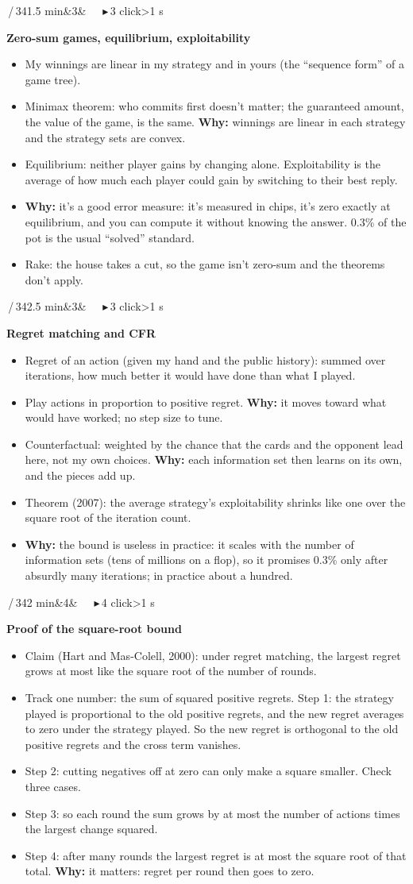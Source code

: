 \documentclass{article}
\newcommand{\slide}[4]{\clearpage
  \noindent\colorbox{bar}{\parbox{\dimexpr\linewidth-2\fboxsep}{\color{white}\fontsize{13}{15}\selectfont
  \textbf{\fontsize{21}{23}\selectfont #1}\,/\,34\hfill #3\ifx&#4&\else\ \ \ \textcolor{ck!40!white}{\ensuremath{\blacktriangleright}}\,#4 click\ifnum#4>1 s\fi\fi\\[2pt]
  \raggedright\textbf{\fontsize{15}{17.5}\selectfont #2}}}\par\vspace{5pt}
  \fontsize{15}{17.8}\selectfont\raggedright}
\newcommand{\pt}{\item[\textbullet]}
\newcommand{\ck}{\item[\textcolor{ck}{\ensuremath{\blacktriangleright}}]}
\newcommand{\why}{\textcolor{why}{\textbf{Why:}} }
\begin{document}
\slide{4}{Zero-sum games, equilibrium, exploitability}{1.5 min}{3}
\begin{itemize}
\pt My winnings are linear in my strategy and in yours (the ``sequence form'' of a game tree).
\ck Minimax theorem: who commits first doesn't matter; the guaranteed amount, the value of the game, is the same. \why winnings are linear in each strategy and the strategy sets are convex.
\ck Equilibrium: neither player gains by changing alone. Exploitability is the average of how much each player could gain by switching to their best reply.
\pt \why it's a good error measure: it's measured in chips, it's zero exactly at equilibrium, and you can compute it without knowing the answer. 0.3\% of the pot is the usual ``solved'' standard.
\ck Rake: the house takes a cut, so the game isn't zero-sum and the theorems don't apply.
\end{itemize}

\slide{5}{Regret matching and CFR}{2.5 min}{3}
\begin{itemize}
\pt Regret of an action (given my hand and the public history): summed over iterations, how much better it would have done than what I played.
\pt Play actions in proportion to positive regret. \why it moves toward what would have worked; no step size to tune.
\ck Counterfactual: weighted by the chance that the cards and the opponent lead here, not my own choices. \why each information set then learns on its own, and the pieces add up.
\ck Theorem (2007): the average strategy's exploitability shrinks like one over the square root of the iteration count.
\ck \why the bound is useless in practice: it scales with the number of information sets (tens of millions on a flop), so it promises 0.3\% only after absurdly many iterations; in practice about a hundred.
\end{itemize}

\slide{6}{Proof of the square-root bound}{2 min}{4}
\begin{itemize}
\pt Claim (Hart and Mas-Colell, 2000): under regret matching, the largest regret grows at most like the square root of the number of rounds.
\ck Track one number: the sum of squared positive regrets. Step 1: the strategy played is proportional to the old positive regrets, and the new regret averages to zero under the strategy played. So the new regret is orthogonal to the old positive regrets and the cross term vanishes.
\ck Step 2: cutting negatives off at zero can only make a square smaller. Check three cases.
\ck Step 3: so each round the sum grows by at most the number of actions times the largest change squared.
\ck Step 4: after many rounds the largest regret is at most the square root of that total. \why it matters: regret per round then goes to zero.
\end{itemize}
\end{document}
